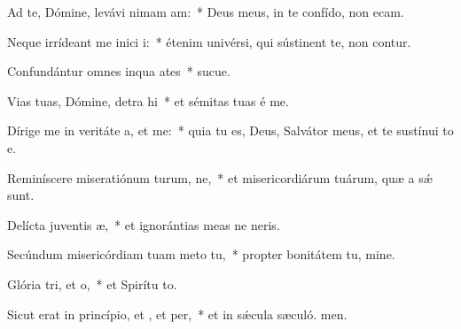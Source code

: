\item Ad te, Dómine, levávi nimam am:~* Deus meus, in te confído, non ecam.
\item Neque irrídeant me inici i:~* étenim univérsi, qui sústinent te, non contur.
\item Confundántur omnes inqua ates~* sucue.
\item Vias tuas, Dómine, detra hi~* et sémitas tuas é me.
\item Dírige me in veritáte a, et  me:~* quia tu es, Deus, Salvátor meus, et te sustínui to e.
\item Reminíscere miseratiónum turum, ne,~* et misericordiárum tuárum, quæ a sǽ sunt.
\item Delícta juventis æ,~* et ignorántias meas ne neris.
\item Secúndum misericórdiam tuam meto  tu,~* propter bonitátem tu, mine.
\item Glória tri, et o,~* et Spirítu to.
\item Sicut erat in princípio, et , et per,~* et in sǽcula sæculó. men.
